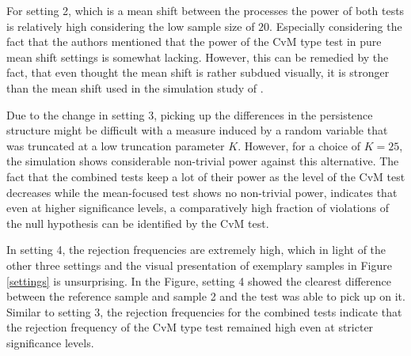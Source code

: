 \documentclass[12pt, a4paper]{article}
\theoremstyle{MAstyle} \newtheorem{assumption}{Assumption}[section]
\theoremstyle{MAstyle} \newtheorem{definition}{Definition}[section]
\theoremstyle{MAstyle} \newtheorem{theorem}{Theorem}[section]
\begin{document}
		For setting 2, which is a mean shift between the processes the power of both tests is relatively high considering the low sample size of $20$. Especially considering the fact that the authors mentioned that the power of the CvM type test in pure mean shift settings is somewhat lacking. However, this can be remedied by the fact, that even thought the mean shift is rather subdued visually, it is stronger than the mean shift used in the simulation study of \cite{bugni_permutation_2021}.
		
		Due to the change in setting 3, picking up the differences in the persistence structure might be difficult with a measure induced by a random variable that was truncated at a low truncation parameter $K$. However, for a choice of $K = 25$, the simulation shows considerable non-trivial power against this alternative. The fact that the combined tests keep a lot of their power as the level of the CvM test decreases while the mean-focused test shows no non-trivial power, indicates that even at higher significance levels, a comparatively high fraction of violations of the null hypothesis can be identified by the CvM test.
		
		In setting 4, the rejection frequencies are extremely high, which in light of the other three settings and the visual presentation of exemplary samples in Figure \ref{settings} is unsurprising. In the Figure, setting 4 showed the clearest difference between the reference sample and sample 2 and the test was able to pick up on it. Similar to setting 3, the rejection frequencies for the combined tests indicate that the rejection frequency of the CvM type test remained high even at stricter significance levels.
	
\end{document}
